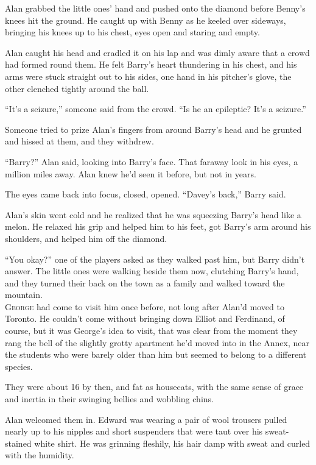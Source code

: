 \documentclass{article}
\begin{document}
Alan grabbed the little ones' hand and pushed onto the diamond before
Benny's knees hit the ground.  He caught up with Benny as he keeled
over sideways, bringing his knees up to his chest, eyes open and
staring and empty.

Alan caught his head and cradled it on his lap and was dimly aware
that a crowd had formed round them.  He felt Barry's heart thundering
in his chest, and his arms were stuck straight out to his sides, one
hand in his pitcher's glove, the other clenched tightly around the
ball.

``It's a seizure,'' someone said from the crowd.  ``Is he an
epileptic?  It's a seizure.''

Someone tried to prize Alan's fingers from around Barry's head and he
grunted and hissed at them, and they withdrew.

``Barry?'' Alan said, looking into Barry's face.  That faraway look in
his eyes, a million miles away.  Alan knew he'd seen it before, but
not in years.

The eyes came back into focus, closed, opened.  ``Davey's back,''
Barry said.

Alan's skin went cold and he realized that he was squeezing Barry's
head like a melon.  He relaxed his grip and helped him to his feet,
got Barry's arm around his shoulders, and helped him off the diamond.

``You okay?'' one of the players asked as they walked past him, but
Barry didn't answer.  The little ones were walking beside them now,
clutching Barry's hand, and they turned their back on the town as a
family and walked toward the mountain.
\\
\lettrine[lines=3, lhang=.5, nindent=0pt, findent=2pt]{G}{eorge} had come to visit him once before, not long after Alan'd moved
to Toronto.  He couldn't come without bringing down Elliot and
Ferdinand, of course, but it was George's idea to visit, that was
clear from the moment they rang the bell of the slightly grotty
apartment he'd moved into in the Annex, near the students who were
barely older than him but seemed to belong to a different species.

They were about 16 by then, and fat as housecats, with the same sense
of grace and inertia in their swinging bellies and wobbling chins.

Alan welcomed them in.  Edward was wearing a pair of wool trousers
pulled nearly up to his nipples and short suspenders that were taut
over his sweat-stained white shirt.  He was grinning fleshily, his
hair damp with sweat and curled with the humidity.
\end{document}

